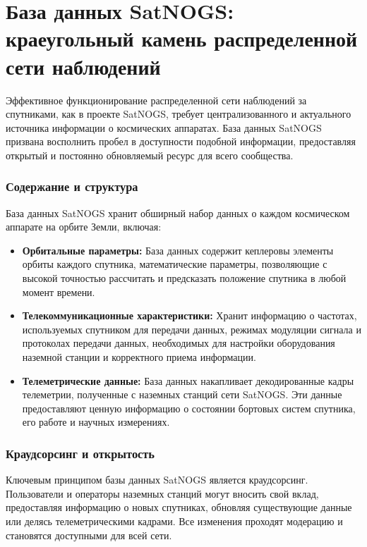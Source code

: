 \documentclass[14pt, a4paper]{../cls/coursework}
\begin{document}
    \section{База данных SatNOGS: краеугольный камень распределенной сети наблюдений}

    Эффективное функционирование распределенной сети наблюдений за спутниками, как в проекте SatNOGS, требует централизованного и актуального источника информации о космических аппаратах.
    База данных SatNOGS призвана восполнить пробел в доступности подобной информации, предоставляя открытый и постоянно обновляемый ресурс для всего сообщества.

    \subsubsection{Содержание и структура}

    База данных SatNOGS хранит обширный набор данных о каждом космическом аппарате на орбите Земли, включая:

    \begin{itemize}
        \item \textbf{Орбитальные параметры:} База данных содержит кеплеровы элементы орбиты каждого спутника,  математические параметры, позволяющие с высокой точностью рассчитать и предсказать положение спутника в любой момент времени.
        \item \textbf{Телекоммуникационные характеристики:} Хранит информацию о частотах, используемых спутником для передачи данных,  режимах модуляции сигнала и протоколах передачи данных, необходимых для настройки оборудования наземной станции и корректного приема информации.
        \item \textbf{Телеметрические данные:}  База данных накапливает декодированные кадры телеметрии, полученные с наземных станций сети SatNOGS. Эти данные предоставляют ценную информацию о состоянии бортовых систем спутника, его работе и научных измерениях.
    \end{itemize}

    \subsubsection{Краудсорсинг и открытость}

    Ключевым принципом базы данных SatNOGS является краудсорсинг.
    Пользователи и операторы наземных станций могут вносить свой вклад, предоставляя информацию о новых спутниках, обновляя существующие данные или делясь телеметрическими кадрами.
    Все изменения проходят модерацию и становятся доступными для всей сети.
\end{document}
